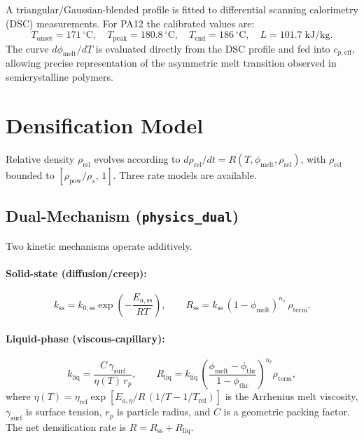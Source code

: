 \documentclass[11pt, letterpaper]{article}
\newcommand{\rhorel}{\rho_{\mathrm{rel}}}
\newcommand{\cpeff}{c_{p,\mathrm{eff}}}
\newcommand{\phimelt}{\phi_{\mathrm{melt}}}
\begin{document}
A triangular/Gaussian-blended profile is fitted to differential scanning
calorimetry (DSC) measurements.
For PA12 the calibrated values are:
%
\begin{equation}
  T_{\mathrm{onset}} = 171\,\mathrm{^\circ C},\quad
  T_{\mathrm{peak}}  = 180.8\,\mathrm{^\circ C},\quad
  T_{\mathrm{end}}   = 186\,\mathrm{^\circ C},\quad
  L = 101.7\;\mathrm{kJ/kg}.
\end{equation}
%
The curve $d\phimelt/dT$ is evaluated directly from the DSC profile and
fed into $\cpeff$, allowing precise representation of the asymmetric
melt transition observed in semicrystalline polymers.

\section{Densification Model}
\label{sec:dens}

Relative density $\rhorel$ evolves according to
$d\rhorel/dt = R(T,\phimelt,\rhorel)$,
with $\rhorel$ bounded to $[\rho_{\mathrm{pow}}/\rho_s,\,1]$.
Three rate models are available.

\subsection{Dual-Mechanism (\texttt{physics\_dual})}

Two kinetic mechanisms operate additively.

\paragraph{Solid-state (diffusion/creep):}
%
\begin{equation}
  k_{\mathrm{ss}} = k_{0,\mathrm{ss}}\exp\!\left(-\frac{E_{a,\mathrm{ss}}}{RT}\right),
  \qquad
  R_{\mathrm{ss}} = k_{\mathrm{ss}}\,(1-\phimelt)^{n_s}\,\rho_{\mathrm{term}}.
\end{equation}

\paragraph{Liquid-phase (viscous-capillary):}
%
\begin{equation}
  k_{\mathrm{liq}} = \frac{C\,\gamma_{\mathrm{surf}}}{\eta(T)\,r_p},
  \qquad
  R_{\mathrm{liq}} = k_{\mathrm{liq}}\,
    \left(\frac{\phimelt-\phi_{\mathrm{thr}}}{1-\phi_{\mathrm{thr}}}\right)^{n_\ell}
    \rho_{\mathrm{term}},
\end{equation}
%
where $\eta(T)=\eta_{\mathrm{ref}}\exp[E_{a,\eta}/R\,(1/T-1/T_{\mathrm{ref}})]$
is the Arrhenius melt viscosity, $\gamma_{\mathrm{surf}}$ is surface tension,
$r_p$ is particle radius, and $C$ is a geometric packing factor.
The net densification rate is $R = R_{\mathrm{ss}} + R_{\mathrm{liq}}$.
\end{document}
